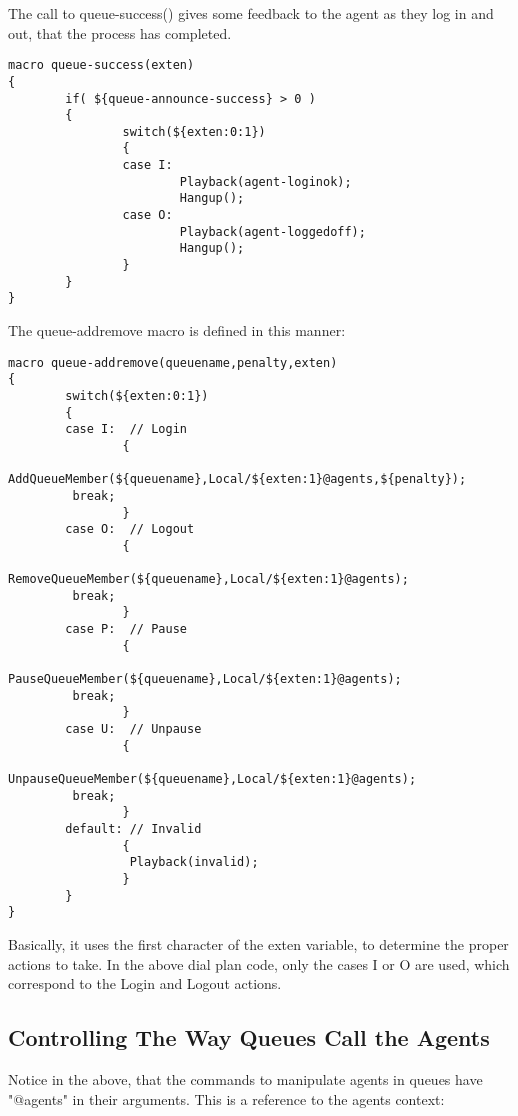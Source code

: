 The call to queue-success() gives some feedback to the agent
as they log in and out, that the process has completed.

\begin{astlisting}
\begin{verbatim}
macro queue-success(exten)
{
        if( ${queue-announce-success} > 0 )
        {
                switch(${exten:0:1})
                {
                case I:
                        Playback(agent-loginok);
                        Hangup();
                case O:
                        Playback(agent-loggedoff);
                        Hangup();
                }
        }
}
\end{verbatim}
\end{astlisting}

The queue-addremove macro is defined in this manner:

\begin{astlisting}
\begin{verbatim}
macro queue-addremove(queuename,penalty,exten)
{
        switch(${exten:0:1})
        {
        case I:  // Login
                {
                 AddQueueMember(${queuename},Local/${exten:1}@agents,${penalty});
		 break;
                }
        case O:  // Logout
                {
                 RemoveQueueMember(${queuename},Local/${exten:1}@agents);
		 break;
                }
        case P:  // Pause
                {
                 PauseQueueMember(${queuename},Local/${exten:1}@agents);
		 break;
                }
        case U:  // Unpause
                {
                 UnpauseQueueMember(${queuename},Local/${exten:1}@agents);
		 break;
                }
        default: // Invalid
                {
                 Playback(invalid);
                }
        }
}
\end{verbatim}
\end{astlisting}

Basically, it uses the first character of the exten variable, to determine the
proper actions to take. In the above dial plan code, only the cases I or O are used,
which correspond to the Login and Logout actions.


\subsection{Controlling The Way Queues Call the Agents}

Notice in the above, that the commands to manipulate agents in queues have
"@agents" in their arguments. This is a reference to the agents context:

